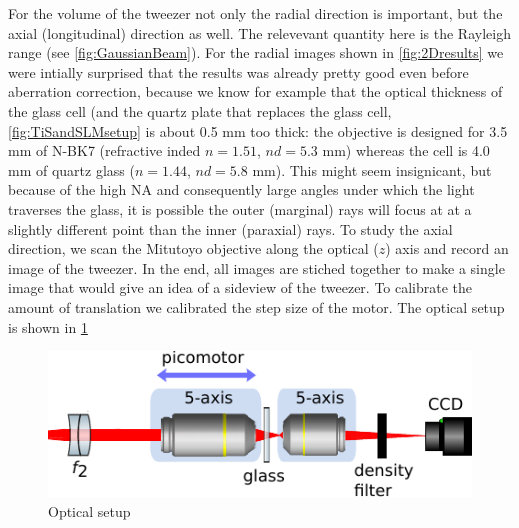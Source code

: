 For the volume of the tweezer not only the radial direction is important, but the axial (longitudinal) direction as well. 
The relevevant quantity here is the Rayleigh range (see \cref{fig:GaussianBeam}).
For the radial images shown in \cref{fig:2Dresults} we were intially surprised that the results was already pretty good even before aberration correction, because we know for example that the optical thickness of the glass cell (and the quartz plate that replaces the glass cell, \cref{fig:TiSandSLMsetup} is about 0.5 mm too thick: the objective is designed for 3.5 mm of N-BK7 (refractive inded $n = 1.51$, $nd = 5.3$ mm) whereas the cell is 4.0 mm of quartz glass ($n = 1.44$, $nd = 5.8$ mm). 
This might seem insignicant, but because of the high \ac{NA} and consequently large angles under which the light traverses the glass, it is possible the outer (marginal) rays will focus at at a slightly different point than the inner (paraxial) rays. 
To study the axial direction, we scan the Mitutoyo objective along the optical ($z$) axis and record an image of the tweezer. 
In the end, all images are stiched together to make a single image that would give an idea of a sideview of the tweezer.
To calibrate the amount of translation we calibrated the step size of the motor. The optical setup is shown in \cref{fig:ZScanSetup}

\begin{figure}
    \centering
    \includegraphics[width=0.6\linewidth]{figures/ZScanSetup.pdf}
    \caption{Optical setup}
    \label{fig:ZScanSetup}
\end{figure}

